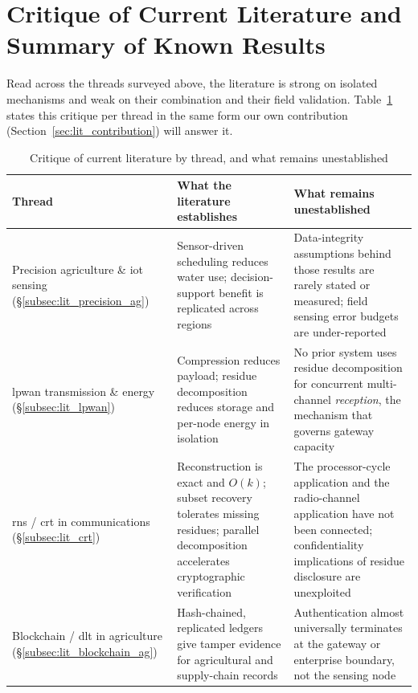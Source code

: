 \documentclass[12pt,a4paper,oneside]{book}
\begin{document}
\section{Critique of Current Literature and Summary of Known Results}
\label{sec:lit_critique}

Read across the threads surveyed above, the literature is strong on
isolated mechanisms and weak on their combination and their field
validation. Table~\ref{tab:lit-gap-summary} states this critique per
thread in the same form our own contribution
(Section~\ref{sec:lit_contribution}) will answer it.

\begin{table}[htbp]
\centering
\caption{Critique of current literature by thread, and what remains
         unestablished}
\label{tab:lit-gap-summary}
\footnotesize
\begin{tabularx}{\textwidth}{@{}p{}X X@{}}
\toprule
\textbf{Thread} & \textbf{What the literature establishes} & \textbf{What remains unestablished} \\
\midrule
Precision agriculture \& \gls{iot} sensing (\S\ref{subsec:lit_precision_ag})
  & Sensor-driven scheduling reduces water use; decision-support benefit is
    replicated across regions
  & Data-integrity assumptions behind those results are rarely stated or
    measured; field sensing error budgets are under-reported \\
\midrule
\gls{lpwan} transmission \& energy (\S\ref{subsec:lit_lpwan})
  & Compression reduces payload; residue decomposition reduces storage and
    per-node energy in isolation
  & No prior system uses residue decomposition for concurrent multi-channel
    \emph{reception}, the mechanism that governs gateway capacity \\
\midrule
\gls{rns} / \gls{crt} in communications (\S\ref{subsec:lit_crt})
  & Reconstruction is exact and $O(k)$; subset recovery tolerates missing
    residues; parallel decomposition accelerates cryptographic verification
  & The processor-cycle application and the radio-channel application have
    not been connected; confidentiality implications of residue disclosure
    are unexploited \\
\midrule
Blockchain / \gls{dlt} in agriculture (\S\ref{subsec:lit_blockchain_ag})
  & Hash-chained, replicated ledgers give tamper evidence for agricultural
    and supply-chain records
  & Authentication almost universally terminates at the gateway or
    enterprise boundary, not the sensing node \\

\end{tabularx}
\end{table}
\end{document}

